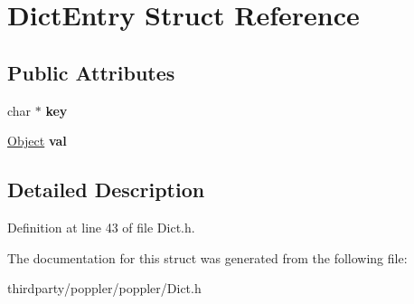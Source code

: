 \hypertarget{struct_dict_entry}{}\section{Dict\+Entry Struct Reference}
\label{struct_dict_entry}
\subsection*{Public Attributes}
\begin{DoxyCompactItemize}
\item 
\mbox{\label{struct_dict_entry_a2c78f7bb03aceaa1e735593baee80531}} 
char $\ast$ {\bfseries key}
\item 
\mbox{\label{struct_dict_entry_a4cd31a863b437c495f0b9757024cfd5d}} 
\hyperlink{class_object}{Object} {\bfseries val}
\end{DoxyCompactItemize}


\subsection{Detailed Description}


Definition at line 43 of file Dict.\+h.



The documentation for this struct was generated from the following file\+:\begin{DoxyCompactItemize}
\item 
thirdparty/poppler/poppler/Dict.\+h\end{DoxyCompactItemize}
